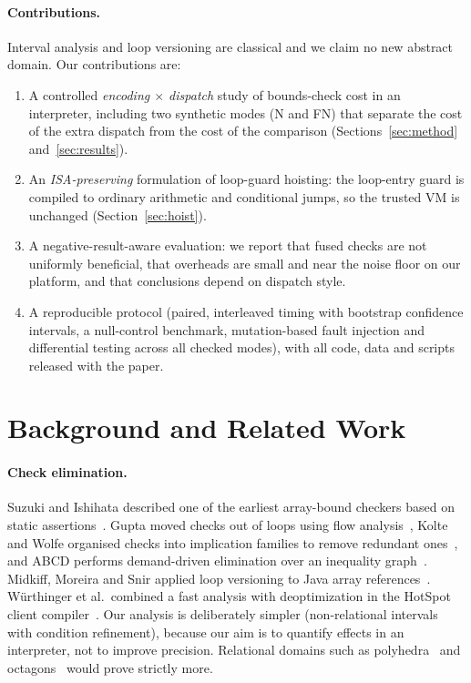 \documentclass[11pt,a4paper]{article}
\begin{document}
\paragraph{Contributions.} Interval analysis and loop versioning are classical and we claim no new abstract domain. Our contributions are:
\begin{enumerate}
\item A controlled \emph{encoding $\times$ dispatch} study of bounds-check cost in an interpreter, including two synthetic modes (N and FN) that separate the cost of the extra dispatch from the cost of the comparison (Sections~\ref{sec:method} and~\ref{sec:results}).
\item An \emph{ISA-preserving} formulation of loop-guard hoisting: the loop-entry guard is compiled to ordinary arithmetic and conditional jumps, so the trusted VM is unchanged (Section~\ref{sec:hoist}).
\item A negative-result-aware evaluation: we report that fused checks are not uniformly beneficial, that overheads are small and near the noise floor on our platform, and that conclusions depend on dispatch style.
\item A reproducible protocol (paired, interleaved timing with bootstrap confidence intervals, a null-control benchmark, mutation-based fault injection and differential testing across all checked modes), with all code, data and scripts released with the paper.
\end{enumerate}

\section{Background and Related Work}
\paragraph{Check elimination.} Suzuki and Ishihata described one of the earliest array-bound checkers based on static assertions~\cite{suzuki1977}. Gupta moved checks out of loops using flow analysis~\cite{gupta1993}, Kolte and Wolfe organised checks into implication families to remove redundant ones~\cite{kolte1995}, and ABCD performs demand-driven elimination over an inequality graph~\cite{bodik2000}. Midkiff, Moreira and Snir applied loop versioning to Java array references~\cite{midkiff1998}. W\"urthinger et al.\ combined a fast analysis with deoptimization in the HotSpot client compiler~\cite{wurthinger2009}. Our analysis is deliberately simpler (non-relational intervals with condition refinement), because our aim is to quantify effects in an interpreter, not to improve precision. Relational domains such as polyhedra~\cite{cousot1978} and octagons~\cite{mine2006} would prove strictly more.
\end{document}
